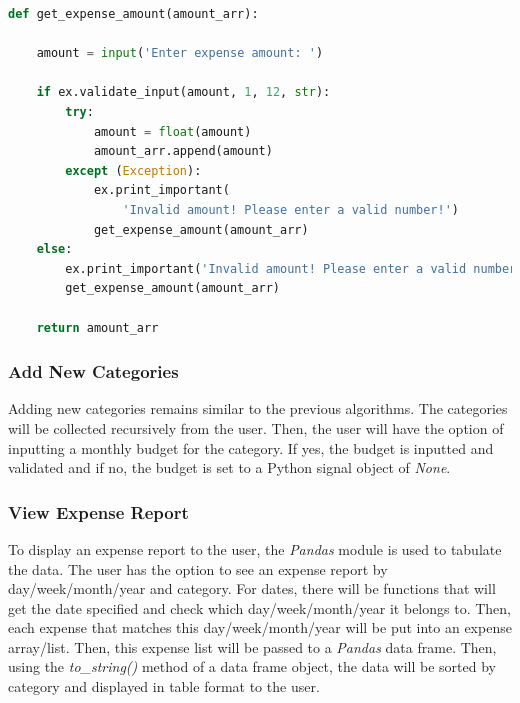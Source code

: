\documentclass[11pt]{article}
\begin{document}
  \begin{lstlisting}[language=Python, caption=Source code for \textit{get\_expense\_amount()}, captionpos=b]
  def get_expense_amount(amount_arr):
    
    amount = input('Enter expense amount: ')

    if ex.validate_input(amount, 1, 12, str):
        try:
            amount = float(amount)
            amount_arr.append(amount)
        except (Exception):
            ex.print_important(
                'Invalid amount! Please enter a valid number!')
            get_expense_amount(amount_arr)
    else:
        ex.print_important('Invalid amount! Please enter a valid number!')
        get_expense_amount(amount_arr)

    return amount_arr
  \end{lstlisting}

  \subsubsection{Add New Categories}
  Adding new categories remains similar to the previous algorithms. The categories will be collected recursively from the user. Then, the user will have the option of inputting a monthly budget for the category. If yes, the budget is inputted and validated and if no, the budget is set to a Python signal object of \textit{None}.

  \subsubsection{View Expense Report}
  To display an expense report to the user, the \textit{Pandas} module is used to tabulate the data.
  The user has the option to see an expense report by day/week/month/year and category. For dates, there will be functions that will get the date specified and check which day/week/month/year it belongs to. Then, each expense that matches this day/week/month/year will be put into an expense array/list. Then, this expense list will be passed to a \textit{Pandas} data frame. Then, using the \textit{to\_string()} method of a data frame object, the data will be sorted by category and displayed in table format to the user.
\end{document}
